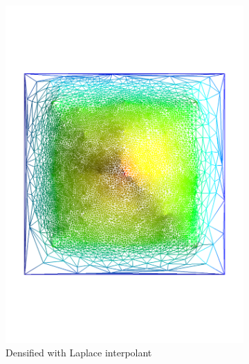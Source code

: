 \begin{figure}
\begin{subfigure}[b]{0.3\linewidth}
    \includegraphics[width=\textwidth]{figs/pyramid_v_tr}
    \caption{Densified with Laplace interpolant}
  \end{subfigure}  
  \quad
  \begin{subfigure}[b]{0.3\linewidth}
    \centering

\end{subfigure}
\end{figure}
